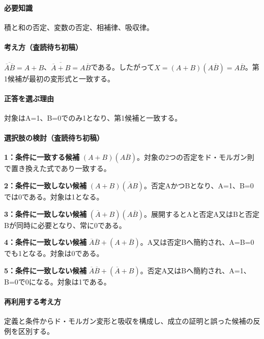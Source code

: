 \paragraph{必要知識} 積と和の否定、変数の否定、相補律、吸収律。

\paragraph{考え方（査読待ち初稿）} \(\overline{\overline A\overline B}=A+B\)、\(\overline{\overline A+B}=A\overline B\)である。したがって\(X=(A+B)(A\overline B)=A\overline B\)。第1候補が最初の変形式と一致する。

\paragraph{正答を選ぶ理由} 対象はA=\allowbreak{}1、B=\allowbreak{}0でのみ1となり、第1候補と一致する。

\paragraph{選択肢の検討（査読待ち初稿）}\mbox{}\par

\noindent\textbf{1：条件に一致する候補} \((A+B)(A\overline B)\)。対象の2つの否定をド・モルガン則で置き換えた式であり一致する。\par

\noindent\textbf{2：条件に一致しない候補} \((A+B)(\overline A B)\)。否定AかつBとなり、A=\allowbreak{}1、B=\allowbreak{}0では0である。対象は1となる。\par

\noindent\textbf{3：条件に一致しない候補} \((\overline A+B)(A\overline B)\)。展開するとAと否定A又はBと否定Bが同時に必要となり、常に0である。\par

\noindent\textbf{4：条件に一致しない候補} \(\overline A\overline B+(A+\overline B)\)。A又は否定Bへ簡約され、A=\allowbreak{}B=\allowbreak{}0でも1となる。対象は0である。\par

\noindent\textbf{5：条件に一致しない候補} \(\overline A\overline B+(\overline A+B)\)。否定A又はBへ簡約され、A=\allowbreak{}1、B=\allowbreak{}0で0になる。対象は1である。\par

\paragraph{再利用する考え方} 定義と条件からド・モルガン変形と吸収を構成し、成立の証明と誤った候補の反例を区別する。


